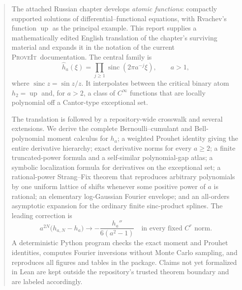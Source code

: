 \documentclass[11pt,oneside]{article}
\numberwithin{equation}{section}
\theoremstyle{definition}
\theoremstyle{remark}
\newcommand{\Up}{\operatorname{up}}
\newcommand{\sinc}{\operatorname{sinc}}
\newcommand{\repo}{\textsc{ProveIt}}
\begin{document}
\begin{abstract}
The attached Russian chapter develops \emph{atomic functions}: compactly supported
solutions of differential--functional equations, with Rvachev's function
$\Up$ as the principal example.  This report supplies a mathematically edited
English translation of the chapter's surviving material and expands it in the
notation of the current \repo\ documentation.  The central family is
\[
  \widehat h_a(\xi)=\prod_{j\ge 1}\sinc(2\pi a^{-j}\xi),\qquad a>1,
\]
where $\sinc z=\sin z/z$.  It interpolates between the critical binary atom
$h_2=\Up$ and, for $a>2$, a class of $C^\infty$ functions that are locally
polynomial off a Cantor-type exceptional set.

The translation is followed by a repository-wide crosswalk and several
extensions.  We derive the complete Bernoulli--cumulant and Bell-polynomial
moment calculus for $h_a$; a weighted Prouhet identity giving the entire
derivative hierarchy; exact derivative norms for every $a\ge2$; a finite
truncated-power formula and a self-similar polynomial-gap atlas; a symbolic
localization formula for derivatives on the exceptional set; a rational-power
Strang--Fix theorem that reproduces arbitrary polynomials by one uniform lattice
of shifts whenever some positive power of $a$ is rational; an elementary
log-Gaussian Fourier envelope; and an all-orders asymptotic expansion for the
ordinary finite sinc-product splines.  The leading correction is
\[
 a^{2N}\bigl(h_{a,N}-h_a\bigr)
 \longrightarrow -\frac{h_a''}{6(a^2-1)}
 \quad\text{in every fixed }C^r\text{ norm}.
\]
A deterministic Python program checks the exact moment and Prouhet identities,
computes Fourier inversions without Monte Carlo sampling, and reproduces all
figures and tables in the package.  Claims not yet formalized in Lean are kept
outside the repository's trusted theorem boundary and are labeled accordingly.


\end{abstract}
\end{document}
